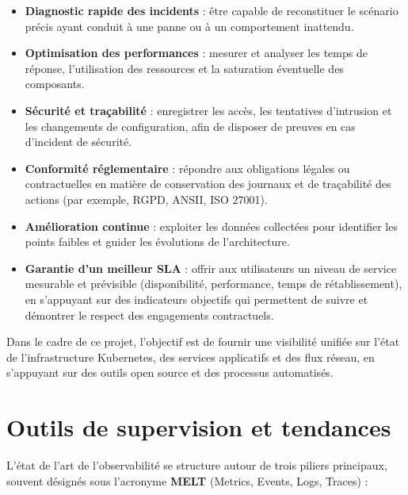 \begin{itemize}
	\item \textbf{Diagnostic rapide des incidents} : être capable de reconstituer le scénario précis ayant conduit à une panne ou à un comportement inattendu.
	\item \textbf{Optimisation des performances} : mesurer et analyser les temps de réponse, l’utilisation des ressources et la saturation éventuelle des composants.
	\item \textbf{Sécurité et traçabilité} : enregistrer les accès, les tentatives d’intrusion et les changements de configuration, afin de disposer de preuves en cas d’incident de sécurité.
	\item \textbf{Conformité réglementaire} : répondre aux obligations légales ou contractuelles en matière de conservation des journaux et de traçabilité des actions (par exemple, RGPD, ANSII, ISO 27001).
	\item \textbf{Amélioration continue} : exploiter les données collectées pour identifier les points faibles et guider les évolutions de l’architecture.
	\item \textbf{Garantie d’un meilleur SLA} : offrir aux utilisateurs un niveau de service mesurable et prévisible (disponibilité, performance, temps de rétablissement), en s’appuyant sur des indicateurs objectifs qui permettent de suivre et démontrer le respect des engagements contractuels.
\end{itemize}

Dans le cadre de ce projet, l’objectif est de fournir une visibilité unifiée sur l’état de l’infrastructure Kubernetes, des services applicatifs et des flux réseau, en s’appuyant sur des outils open source et des processus automatisés.

\section{Outils de supervision et tendances}

L’état de l’art de l’observabilité se structure autour de trois piliers principaux, souvent désignés sous l’acronyme \textbf{MELT} (Metrics, Events, Logs, Traces) :

